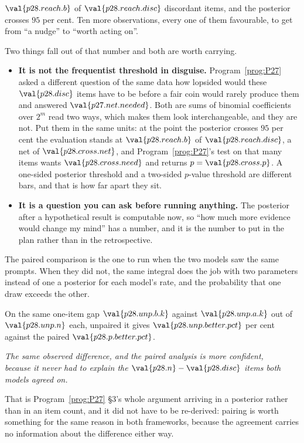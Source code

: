 \begin{fr}

$\val{p28.reach.b}$ of $\val{p28.reach.disc}$ discordant items, and the
posterior crosses $95$ per cent. Ten more observations, every one of them
favourable, to get from \enquote{a nudge} to \enquote{worth acting on}.

Two things fall out of that number and both are worth carrying.

\begin{itemize}
\item \textbf{It is not the frequentist threshold in disguise.}
  Program~\ref{prog:P27} asked a different question of the same data
  \dash{} how lopsided would these $\val{p28.disc}$ items have to be before
  a fair coin would rarely produce them \dash{} and answered
  $\val{p27.net.needed}$. Both are sums of binomial coefficients over
  $2^{m}$ read two ways, which makes them look interchangeable, and they are
  not. Put them in the same units: at the point the posterior crosses $95$
  per cent the evaluation stands at $\val{p28.reach.b}$ of
  $\val{p28.reach.disc}$, a net of $\val{p28.cross.net}$, and
  Program~\ref{prog:P27}'s test on that many items wants
  $\val{p28.cross.need}$ and returns $p = \val{p28.cross.p}$. A one-sided
  posterior threshold and a two-sided $p$-value threshold are different
  bars, and that is how far apart they sit.
\item \textbf{It is a question you can ask before running anything.} The
  posterior after a hypothetical result is computable now, so \enquote{how
  much more evidence would change my mind} has a number, and it is the number
  to put in the plan rather than in the retrospective.
\end{itemize}
\end{fr}

\begin{fr}
The paired comparison is the one to run when the two models saw the same
prompts. When they did not, the same integral does the job with two
parameters instead of one \dash{} a posterior for each model's rate, and the
probability that one draw exceeds the other.

On the same one-item gap \dash{} $\val{p28.unp.b.k}$ against
$\val{p28.unp.a.k}$ out of $\val{p28.unp.n}$ each, unpaired \dash{} it gives
$\val{p28.unp.better.pct}$ per cent against the paired
$\val{p28.p.better.pct}$.

\begin{center}
\emph{The same observed difference, and the paired analysis is more
confident,\\
because it never had to explain the $\val{p28.n} - \val{p28.disc}$ items
both models agreed on.}
\end{center}

That is Program~\ref{prog:P27} §3's whole argument arriving in a posterior
rather than in an item count, and it did not have to be re-derived: pairing is
worth something for the same reason in both frameworks, because the
agreement carries no information about the difference either way.
\end{fr}

